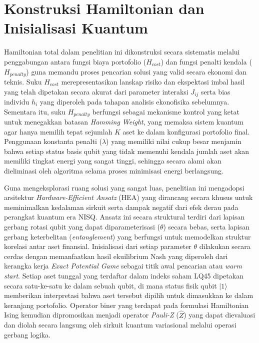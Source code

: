 \section{Konstruksi Hamiltonian dan Inisialisasi Kuantum}
Hamiltonian total dalam penelitian ini dikonstruksi secara sistematis melalui penggabungan antara fungsi biaya portofolio ($H_{cost}$) dan fungsi penalti kendala ($H_{penalty}$) guna memandu proses pencarian solusi yang valid secara ekonomi dan teknis. Suku $H_{cost}$ merepresentasikan lanskap risiko dan ekspektasi imbal hasil yang telah dipetakan secara akurat dari parameter interaksi $J_{ij}$ serta bias individu $h_i$ yang diperoleh pada tahapan analisis ekonofisika sebelumnya. Sementara itu, suku $H_{penalty}$ berfungsi sebagai mekanisme kontrol yang ketat untuk menegakkan batasan \textit{Hamming Weight}, yang memaksa sistem kuantum agar hanya memilih tepat sejumlah $K$ aset ke dalam konfigurasi portofolio final. Penggunaan konstanta penalti ($\lambda$) yang memiliki nilai cukup besar menjamin bahwa setiap status basis qubit yang tidak memenuhi kendala jumlah aset akan memiliki tingkat energi yang sangat tinggi, sehingga secara alami akan dieliminasi oleh algoritma selama proses minimisasi energi berlangsung.

Guna mengeksplorasi ruang solusi yang sangat luas, penelitian ini mengadopsi arsitektur \textit{Hardware-Efficient Ansatz} (HEA) yang dirancang secara khusus untuk meminimalkan kedalaman sirkuit serta dampak negatif dari efek derau pada perangkat kuantum era NISQ. Ansatz ini secara struktural terdiri dari lapisan gerbang rotasi qubit yang dapat diparameterisasi ($\theta$) secara bebas, serta lapisan gerbang keterbelitan (\textit{entanglement}) yang berfungsi untuk memodelkan struktur korelasi antar aset finansial. Inisialisasi dari setiap parameter $\theta$ dilakukan secara cerdas dengan memanfaatkan hasil ekuilibrium Nash yang diperoleh dari kerangka kerja \textit{Exact Potential Game} sebagai titik awal pencarian atau \textit{warm start}. Setiap aset tunggal yang terdaftar dalam indeks saham LQ45 dipetakan secara satu-ke-satu ke dalam sebuah qubit, di mana status fisik qubit $|1\rangle$ memberikan interpretasi bahwa aset tersebut dipilih untuk dimasukkan ke dalam keranjang portofolio. Operator biner yang terdapat pada formulasi Hamiltonian Ising kemudian dipromosikan menjadi operator \textit{Pauli-Z} ($\hat{Z}$) yang dapat dievaluasi dan diolah secara langsung oleh sirkuit kuantum variasional melalui operasi gerbang logika.
